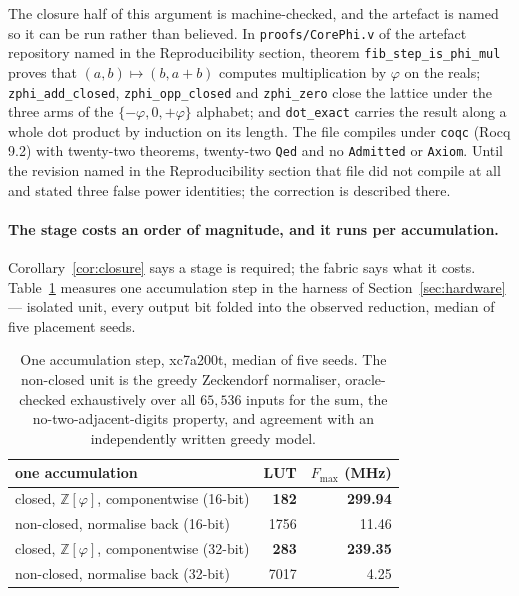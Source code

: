\documentclass[11pt]{article}
\theoremstyle{definition}
\begin{document}
The closure half of this argument is machine-checked, and the artefact is named
so it can be run rather than believed. In
\texttt{proofs/CorePhi.v} of the artefact repository named in the
Reproducibility section, theorem \texttt{fib\_step\_is\_phi\_mul}
proves that $(a,b)\mapsto(b,a+b)$ computes multiplication by $\varphi$ on the
reals; \texttt{zphi\_add\_closed}, \texttt{zphi\_opp\_closed} and
\texttt{zphi\_zero} close the lattice under the three arms of the
$\{-\varphi,0,+\varphi\}$ alphabet; and \texttt{dot\_exact} carries the result
along a whole dot product by induction on its length. The file compiles under
\texttt{coqc} (Rocq 9.2) with twenty-two theorems, twenty-two \texttt{Qed} and
no \texttt{Admitted} or \texttt{Axiom}. Until the revision named in the
Reproducibility section that file did not compile at all and stated three false
power identities; the correction is described there.

\paragraph{The stage costs an order of magnitude, and it runs per accumulation.}
Corollary~\ref{cor:closure} says a stage is required; the fabric says what it
costs. Table~\ref{tab:closure} measures one accumulation step in the harness of
Section~\ref{sec:hardware} --- isolated unit, every output bit folded into the
observed reduction, median of five placement seeds.

\begin{table}[t]\centering
\caption{One accumulation step, xc7a200t, median of five seeds. The non-closed
unit is the greedy Zeckendorf normaliser, oracle-checked exhaustively over all
$65{,}536$ inputs for the sum, the no-two-adjacent-digits property, and
agreement with an independently written greedy model.}
\label{tab:closure}
\begin{tabular}{lrr}
\toprule
one accumulation & LUT & $F_{\max}$ (MHz) \\
\midrule
closed, $\mathbb{Z}[\varphi]$, componentwise (16-bit) & \textbf{182} & \textbf{299.94} \\
non-closed, normalise back (16-bit)                   & 1756 & 11.46 \\
\addlinespace
closed, $\mathbb{Z}[\varphi]$, componentwise (32-bit) & \textbf{283} & \textbf{239.35} \\
non-closed, normalise back (32-bit)                   & 7017 & 4.25 \\
\bottomrule
\end{tabular}
\end{table}
\end{document}
